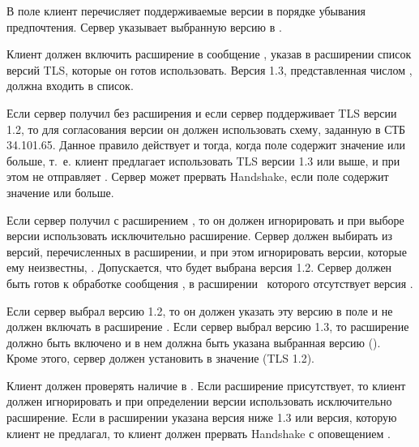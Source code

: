 В поле  клиент перечисляет поддерживаемые версии в порядке 
убывания предпочтения. Сервер указывает выбранную версию в 
.

Клиент должен включить расширение  в сообщение 
, указав в расширении список версий TLS, которые он 
готов использовать. Версия 1.3, представленная числом , должна 
входить в список.

Если сервер получил  без расширения 
 и если сервер поддерживает TLS версии 1.2, то 
для согласования версии он должен использовать схему, заданную в СТБ 34.101.65. 
%
Данное правило действует и тогда, когда поле  
содержит значение  или больше, т.~е. клиент предлагает 
использовать TLS версии 1.3 или выше, и при этом не отправляет 
.
%
Сервер может прервать Handshake, если поле  
содержит значение  или больше.

Если сервер получил  с расширением
, то он должен игнорировать
 и при выборе версии использовать 
исключительно расширение. Сервер должен выбирать из версий, перечисленных в 
расширении, и при этом игнорировать версии, которые ему неизвестны,
.
%
Допускается, что будет выбрана версия 1.2.
%
Сервер должен быть готов к обработке сообщения , в 
расширении~ которого отсутствует версия . 

Если сервер выбрал версию 1.2, то он должен указать эту версию в поле 
 и не должен включать в  
расширение .
%
Если сервер выбрал версию 1.3, то расширение должно быть включено и в нем 
должна быть указана выбранная версию (). Кроме этого, сервер 
должен установить в  значение  
(TLS 1.2).

Клиент должен проверять наличие  в 
. Если расширение присутствует, то клиент должен 
игнорировать  и при определении версии 
использовать исключительно расширение. Если в расширении указана версия ниже 
1.3 или версия, которую клиент не предлагал, то клиент должен прервать 
Handshake с оповещением .

